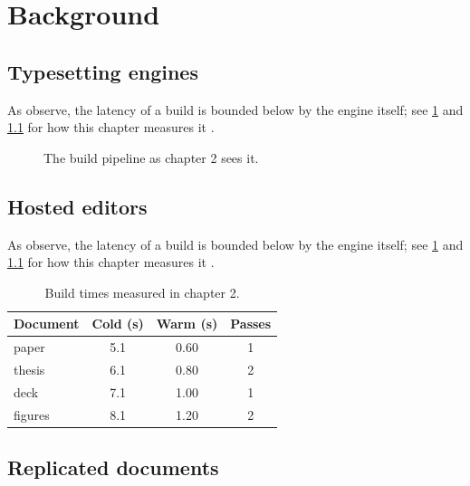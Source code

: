 \chapter{Background}\label{ch:background}

\section{Typesetting engines}\label{sec:background-0}
\lipsum[57-70]

As \textcite{knuth1984} observe, the latency \latency{} of a build is
bounded below by the engine itself; see \cref{ch:background} and \cref{fig:background}
for how this chapter measures it \parencite{shapiro2011}.

\begin{figure}[t]
  \centering
  \caption{The build pipeline as chapter 2 sees it.}\label{fig:background}
\end{figure}

\section{Hosted editors}\label{sec:background-1}
\lipsum[71-84]

As \textcite{shapiro2011} observe, the latency \latency{} of a build is
bounded below by the engine itself; see \cref{ch:background} and \cref{fig:background}
for how this chapter measures it \parencite{nielsen1993}.

\begin{table}[t]
  \centering
  \begin{tabular}{lSSS}
    \toprule
    Document & {Cold (s)} & {Warm (s)} & {Passes} \\
    \midrule
    paper & 5.1 & 0.60 & 1 \\
    thesis & 6.1 & 0.80 & 2 \\
    deck & 7.1 & 1.00 & 1 \\
    figures & 8.1 & 1.20 & 2 \\
    \bottomrule
  \end{tabular}
  \caption{Build times measured in chapter 2.}\label{tab:background}
\end{table}

\section{Replicated documents}\label{sec:background-2}
\lipsum[85-98]

